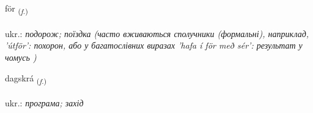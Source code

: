 \documentclass[frontgrid, backgrid]{flacards}\usepackage[]{graphicx}\usepackage[]{xcolor}
\begin{document}
\renewcommand{\flhead}{\vskip5pt \fboxsep=0pt {\small\bfseries\footnotesize Nafnorð | іменник}}
\renewcommand{\fcfoot}{\vskip5pt \fboxsep=0pt \hspace{2pt}{\small\bfseries\footnotesize 2K}}

\renewcommand{\blhead}{\vskip5pt {\small\bfseries\footnotesize Nafnorð | іменник }}
\renewcommand{\bcfoot}{\vskip5pt \hspace{2pt}{\small\bfseries\footnotesize 2K}}


{för \small{\textsubscript{(\textit{f.})}} \\[1ex] %
\textphonetic{[fœːr]} \\
ukr.: \emph{подорож; поїздка (часто вживаються сполучники (формальні), наприклад, 'útför': похорон, або у багатослівних виразах 'hafa í för með sér': результат у чомусь )} \\  [2ex]
\renewcommand*{\arraystretch}{0.8}
}

\renewcommand{\flhead}{\vskip5pt \fboxsep=0pt {\small\bfseries\footnotesize Nafnorð | іменник}}
\renewcommand{\fcfoot}{\vskip5pt \fboxsep=0pt \hspace{2pt}{\small\bfseries\footnotesize 2K}}

\renewcommand{\blhead}{\vskip5pt {\small\bfseries\footnotesize Nafnorð | іменник }}
\renewcommand{\bcfoot}{\vskip5pt \hspace{2pt}{\small\bfseries\footnotesize 2K}}


{dagskrá \small{\textsubscript{(\textit{f.})}} \\[1ex] %
\textphonetic{[taxskrau]} \\
ukr.: \emph{програма; захід} \\  [2ex]
\renewcommand*{\arraystretch}{0.8}
}
\end{document}
